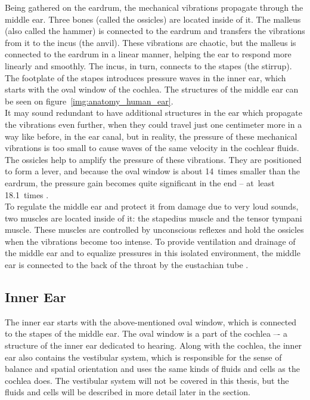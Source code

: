 Being gathered on the eardrum, the mechanical vibrations propagate through the middle ear. Three bones (called the ossicles) are located inside of it. The malleus (also called the hammer) is connected to the eardrum and transfers the vibrations from it to the incus (the anvil). These vibrations are chaotic, but the malleus is connected to the eardrum in a linear manner, helping the ear to respond more linearly and smoothly. The incus, in turn, connects to the stapes (the stirrup). The footplate of the stapes introduces pressure waves in the inner ear, which starts with the oval window of the cochlea. The structures of the middle ear can be seen on figure~\ref{img:anatomy_human_ear}.\\

It may sound redundant to have additional structures in the ear which propagate the vibrations even further, when they could travel just one centimeter more in a way like before, in the ear canal, but in reality, the pressure of these mechanical vibrations is too small to cause waves of the same velocity in the cochlear fluids. The ossicles help to amplify the pressure of these vibrations. They are positioned to form a lever, and because the oval window is about 14~times smaller than the eardrum, the pressure gain becomes quite significant in the end -- at~least 18.1~times \cite{Standring2008}.\\

To regulate the middle ear and protect it from damage due to very loud sounds, two muscles are located inside of it: the stapedius muscle and the tensor tympani muscle. These muscles are controlled by unconscious reflexes and hold the ossicles when the vibrations become too intense. To provide ventilation and drainage of the middle ear and to equalize pressures in this isolated environment, the middle ear is connected to the back of the throat by the eustachian tube \cite{Schnupp2011}.

\subsection{Inner Ear}

The inner ear starts with the above-mentioned oval window, which is connected to the stapes of the middle ear. The oval window is a part of the cochlea –- a structure of the inner ear dedicated to hearing. Along with the cochlea, the inner ear also contains the vestibular system, which is responsible for the sense of balance and spatial orientation and uses the same kinds of fluids and cells as the cochlea does. The vestibular system will not be covered in this thesis, but the fluids and cells will be described in more detail later in the section.\\

